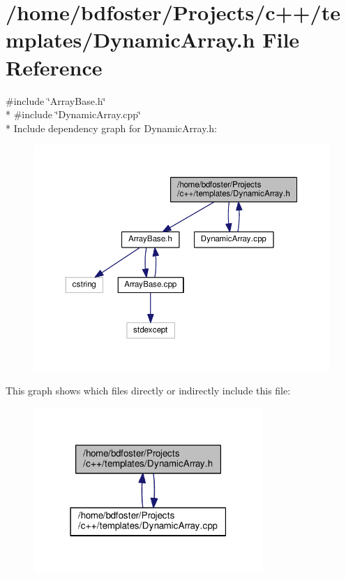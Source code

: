 \hypertarget{a00006}{\section{/home/bdfoster/\+Projects/c++/templates/\+Dynamic\+Array.h File Reference}
\label{a00006}
}
{\ttfamily \#include \char`\"{}Array\+Base.\+h\char`\"{}}\\*
{\ttfamily \#include \char`\"{}Dynamic\+Array.\+cpp\char`\"{}}\\*
Include dependency graph for Dynamic\+Array.\+h\+:
\nopagebreak
\begin{figure}[H]
\begin{center}
\leavevmode
\includegraphics[width=350pt]{d7/dd4/a00013}
\end{center}
\end{figure}
This graph shows which files directly or indirectly include this file\+:
\nopagebreak
\begin{figure}[H]
\begin{center}
\leavevmode
\includegraphics[width=247pt]{d2/de7/a00014}
\end{center}
\end{figure}
